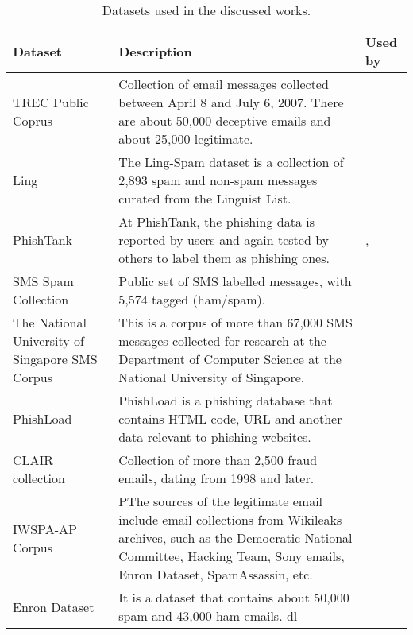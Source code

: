 \begin{table}[ht]
    \centering
    \begin{tabular}{p{3cm}p{10cm}p{1cm}}
    \hline
    \textbf{Dataset} & \textbf{Description} & \textbf{Used by} \\
    \hline
    TREC Public Coprus & Collection of email
    messages collected between April 8 and July 6, 2007. There are about 50,000 deceptive emails and about 25,000 legitimate. & \cite{rabbi2023phishy} \\
    \hline
    Ling & The Ling-Spam dataset is a collection of 2,893 spam and non-spam messages curated from the Linguist List.  & \cite{rabbi2023phishy} \\
    \hline
    PhishTank & At PhishTank, the phishing data is reported by users and again tested by others to label them as phishing ones.  & \cite{Shaukat2023},~\cite{Karhani2023206} \\
    \hline
    SMS Spam Collection & Public set of SMS labelled messages, with 5,574 tagged (ham/spam). & \cite{Karhani2023206} \\
    \hline
    The National University of Singapore SMS Corpus & This is a corpus of more than 67,000 SMS messages collected for research at the Department of Computer Science at the National University of Singapore.  & \cite{Karhani2023206} \\
    \hline
    PhishLoad & PhishLoad is a phishing database that contains HTML code, URL and another data relevant to phishing websites. & \cite{Benavides-Astudillo2023} \\
    \hline
    CLAIR collection & Collection of more than 2,500 fraud emails, dating from 1998 and later. & \cite{ALHOGAIL2021102414}\\
    \hline
    IWSPA-AP Corpus & PThe sources of the legitimate email include email
    collections from Wikileaks archives, such as the Democratic National Committee, Hacking Team, Sony emails, Enron Dataset, SpamAssassin, etc. & \cite{8701426} \\
    \hline
    Enron Dataset & It is a dataset that contains about 50,000 spam and 43,000 ham emails. \ac{dl} & \cite{atawneh2023phishing} \\
    \hline
    \end{tabular}
    \caption{Datasets used in the discussed works.}
    \label{tbl:c2:datasets_table}
    \end{table}